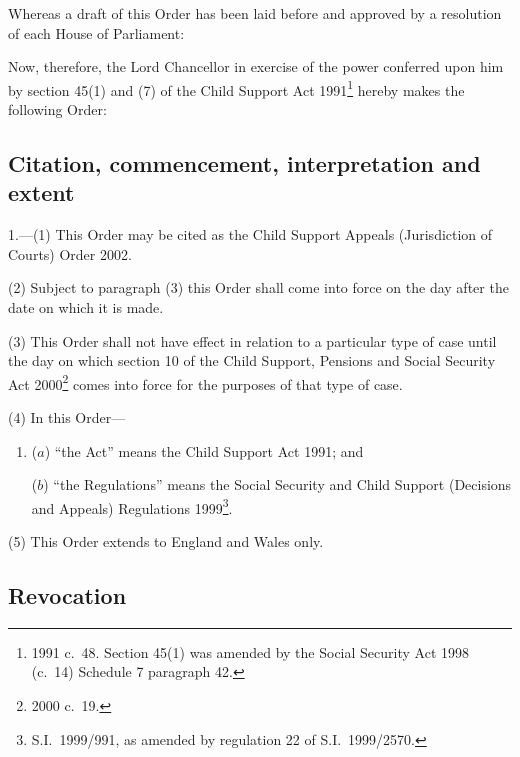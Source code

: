 \documentclass[12pt,a4paper]{article}
\title{\regstitle}
\author{S.I.\ 2002 No.\ 1915 (L.\ 9)}
\date{Made
20th July 2002\\
Coming into force
in accordance with article 1(2)
}
\begin{document}
\maketitle

\noindent
Whereas a draft of this Order has been laid before and approved by a resolution of each House of Parliament:

Now, therefore, the Lord Chancellor in exercise of the power conferred upon him by section 45(1) and (7) of the Child Support Act 1991\footnote{1991 c.\ 48. Section 45(1) was amended by the Social Security Act 1998 (c.\ 14) Schedule 7 paragraph 42.} hereby makes the following Order: 

{\sloppy

\tableofcontents

}

\bigskip

\setcounter{secnumdepth}{-2}

\subsection[1. Citation, commencement, interpretation and extent]{Citation, commencement, interpretation and extent}

1.---(1)  This Order may be cited as the Child Support Appeals (Jurisdiction of Courts) Order 2002.

(2) Subject to paragraph (3) this Order shall come into force on the day after the date on which it is made.

(3) This Order shall not have effect in relation to a particular type of case until the day on which section 10 of the Child Support, Pensions and Social Security Act 2000\footnote{2000 c.\ 19.} comes into force for the purposes of that type of case.

(4) In this Order—
\begin{enumerate}\item[]
($a$) “the Act” means the Child Support Act 1991; and

($b$) “the Regulations” means the Social Security and Child Support (Decisions and Appeals) Regulations 1999\footnote{S.I.\ 1999/991, as amended by regulation 22 of S.I.\ 1999/2570.}.
\end{enumerate}

(5) This Order extends to England and Wales only.

\subsection[2. Revocation]{Revocation}
\end{document}
